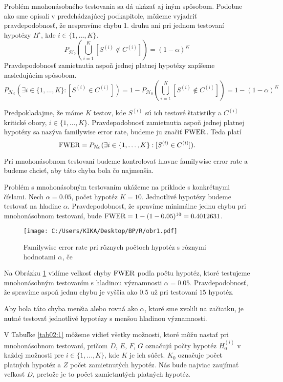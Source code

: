Problém mnohonásobného testovania sa dá ukázať aj iným spôsobom. 
Podobne ako sme opísali v predchádzajúcej podkapitole, môžeme vyjadriť pravdepodobnosť, 
že nespravíme chybu 1. druhu ani pri jednom testovaní hypotézy $H^i$, kde $i \in \{1, \dots, K\}$. 
$$ P_{\mathcal{H}_0} ( \bigcup_{i=1}^{K} [S^{(i)} \notin C^{(i)}] ) = (1 - \alpha)^K $$
Pravdepodobnosť zamietnutia aspoň jednej platnej hypotézy zapíšeme nasledujúcim spôsobom. 
$$ P_{\mathcal{H}_0} ( \exists i \in \{1, \dots, K\}: [S^{(i)} \in C^{(i)}] ) 
   = 1 - P_{\mathcal{H}_0} ( \bigcup_{i=1}^{K} [S^{(i)} \notin C^{(i)}] ) = 1 - (1 - \alpha)^K $$    

\begin{definicia}\label{def5} 
  Predpokladajme, že máme $K$ testov, kde $S^{(i)}$ sú ich testové štatistiky a $C^{(i)}$ kritické obory, $i \in \{1, \dots, K\}$. 
  Pravdepodobnosť zamietnutia aspoň jednej platnej hypotézy sa nazýva familywise error rate, 
  budeme ju značiť ${\rm FWER}$. Teda platí 
  $$ {\rm FWER} = P_{\mathcal{H}_0} ( \exists i \in \{1, \dots, K\}: [S^{(i)} \in C^{(i)}] ). $$
\end{definicia}

Pri mnohonásobnom testovaní budeme kontrolovať hlavne familywise error rate a budeme chcieť, 
aby táto chyba bola čo najmenšia. 

Problém s mnohonásobným testovaním ukážeme na príklade s konkrétnymi číslami. 
Nech $\alpha = 0.05$, počet hypotéz $K = 10$. Jednotlivé hypotézy budeme testovať na hladine $\alpha$. 
Pravdepodobnosť, že spravíme minimálne jednu chybu pri mnohonásobnom testovaní, 
bude ${\rm FWER} = 1 - (1 - 0.05)^{10} = 0.4012631$. 

\begin{figure}[h!]
  \centering
  \texttt{[image: C:/Users/KIKA/Desktop/BP/R/obr1.pdf]}
  \caption{Familywise error rate pri rôznych počtoch hypotéz s rôznymi hodnotami $\alpha$, 
  če}
  \label{obr02:1}
\end{figure}

Na Obrázku \ref{obr02:1} vidíme veľkosť chyby ${\rm FWER}$ podľa počtu hypotéz, 
ktoré testujeme mnohonásobným testovaním s hladinou významnosti $\alpha = 0.05$. 
Pravdepodobnosť, že spravíme aspoň jednu chybu je vyššia ako $0.5$ už pri testovaní $15$ hypotéz. 

Aby bola táto chyba menšia alebo rovná ako $\alpha$, ktoré sme zvolili na začiatku, 
je nutné testovať jednotlivé hypotézy s menšou hladinou významnosti. 

V Tabuľke \ref{tab02:1} môžeme vidieť všetky možnosti, ktoré môžu nastať pri mnohonásobnom testovaní, 
pričom $D$, $E$, $F$, $G$ označujú počty hypotéz $H^{(i)}_0$ v každej možnosti pre $i \in \{1, \dots, K\}$, kde $K$ je ich súčet. 
$K_0$ označuje počet platných hypotéz a $Z$ počet zamietnutých hypotéz. 
Nás bude najviac zaujímať veľkosť $D$, pretože je to počet zamietnutých platných hypotéz. 

